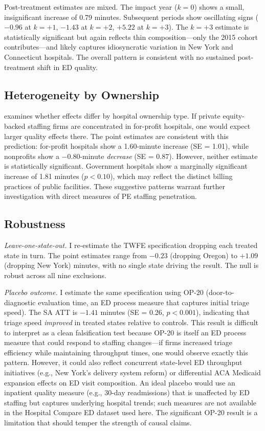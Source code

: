 \documentclass[12pt]{article}
\begin{document}
Post-treatment estimates are mixed. The impact year ($k = 0$) shows a small, insignificant increase of 0.79 minutes. Subsequent periods show oscillating signs ($-0.96$ at $k = +1$, $-1.43$ at $k = +2$, $+5.22$ at $k = +3$). The $k = +3$ estimate is statistically significant but again reflects thin composition---only the 2015 cohort contributes---and likely captures idiosyncratic variation in New York and Connecticut hospitals. The overall pattern is consistent with no sustained post-treatment shift in ED quality.

\subsection{Heterogeneity by Ownership}



 examines whether effects differ by hospital ownership type. If private equity-backed staffing firms are concentrated in for-profit hospitals, one would expect larger quality effects there. The point estimates are consistent with this prediction: for-profit hospitals show a 1.60-minute increase (SE = 1.01), while nonprofits show a $-0.80$-minute \emph{decrease} (SE = 0.87). However, neither estimate is statistically significant. Government hospitals show a marginally significant increase of 1.81 minutes ($p < 0.10$), which may reflect the distinct billing practices of public facilities. These suggestive patterns warrant further investigation with direct measures of PE staffing penetration.

\subsection{Robustness}

\textit{Leave-one-state-out.} I re-estimate the TWFE specification dropping each treated state in turn. The point estimates range from $-0.23$ (dropping Oregon) to $+1.09$ (dropping New York) minutes, with no single state driving the result. The null is robust across all nine exclusions.

\textit{Placebo outcome.} I estimate the same specification using OP-20 (door-to-diagnostic evaluation time, an ED process measure that captures initial triage speed). The SA ATT is $-1.41$ minutes (SE = 0.26, $p < 0.001$), indicating that triage speed \emph{improved} in treated states relative to controls. This result is difficult to interpret as a clean falsification test because OP-20 is itself an ED process measure that could respond to staffing changes---if firms increased triage efficiency while maintaining throughput times, one would observe exactly this pattern. However, it could also reflect concurrent state-level ED throughput initiatives (e.g., New York's delivery system reform) or differential ACA Medicaid expansion effects on ED visit composition. An ideal placebo would use an inpatient quality measure (e.g., 30-day readmissions) that is unaffected by ED staffing but captures underlying hospital trends; such measures are not available in the Hospital Compare ED dataset used here. The significant OP-20 result is a limitation that should temper the strength of causal claims.
\end{document}
